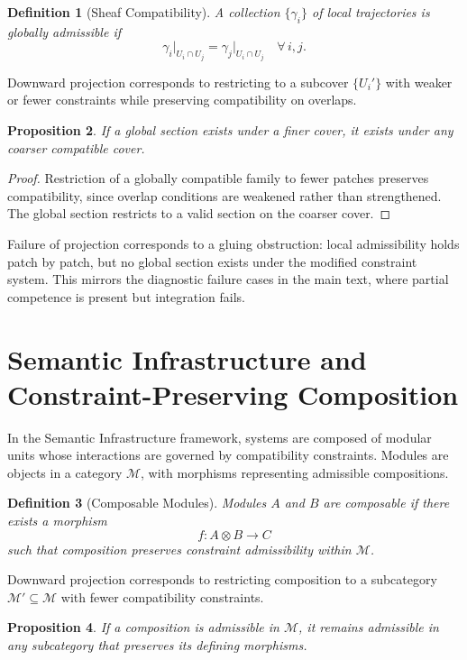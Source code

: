 \documentclass[12pt, a4paper]{article}
\newtheorem{definition}{Definition}[section]
\newtheorem{proposition}[definition]{Proposition}
\begin{document}
\begin{definition}[Sheaf Compatibility]
A collection $\{\gamma_i\}$ of local trajectories is globally admissible if
\[
\gamma_i\big|_{U_i \cap U_j} = \gamma_j\big|_{U_i \cap U_j}
\quad \forall\, i, j.
\]
\end{definition}

Downward projection corresponds to restricting to a subcover $\{U_i'\}$ with weaker or fewer constraints while preserving compatibility on overlaps.

\begin{proposition}
If a global section exists under a finer cover, it exists under any coarser compatible cover.
\end{proposition}

\begin{proof}
Restriction of a globally compatible family to fewer patches preserves compatibility, since overlap conditions are weakened rather than strengthened. The global section restricts to a valid section on the coarser cover.
\end{proof}

Failure of projection corresponds to a gluing obstruction: local admissibility holds patch by patch, but no global section exists under the modified constraint system. This mirrors the diagnostic failure cases in the main text, where partial competence is present but integration fails.

\section{Semantic Infrastructure and Constraint-Preserving Composition}

In the Semantic Infrastructure framework, systems are composed of modular units whose interactions are governed by compatibility constraints. Modules are objects in a category $\mathcal{M}$, with morphisms representing admissible compositions.

\begin{definition}[Composable Modules]
Modules $A$ and $B$ are composable if there exists a morphism
\[
f : A \otimes B \to C
\]
such that composition preserves constraint admissibility within $\mathcal{M}$.
\end{definition}

Downward projection corresponds to restricting composition to a subcategory $\mathcal{M}' \subseteq \mathcal{M}$ with fewer compatibility constraints.

\begin{proposition}
If a composition is admissible in $\mathcal{M}$, it remains admissible in any subcategory that preserves its defining morphisms.
\end{proposition}
\end{document}
